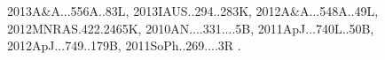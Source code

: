 \documentclass[12pt]{article}
\begin{document}
\begin{enumerate}
\begin{enumerate}
{2013A&A...556A..83L,%
2013IAUS..294..283K,%
2012A&A...548A..49L,%
2012MNRAS.422.2465K,%
2010AN....331....5B,%
2011ApJ...740L..50B,%
2012ApJ...749..179B,%
2011SoPh..269....3R%
}.


\end{enumerate}
\end{enumerate}
\end{document}
